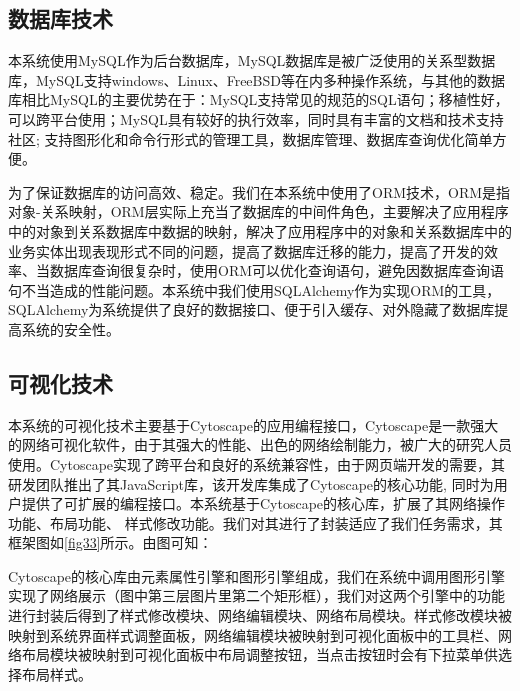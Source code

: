 \subsection{数据库技术}
本系统使用MySQL作为后台数据库，MySQL数据库是被广泛使用的关系型数据库，MySQL支持windows、Linux、FreeBSD等在内多种操作系统，与其他的数据库相比MySQL的主要优势在于：MySQL支持常见的规范的SQL语句；移植性好，可以跨平台使用；MySQL具有较好的执行效率，同时具有丰富的文档和技术支持社区; 支持图形化和命令行形式的管理工具，数据库管理、数据库查询优化简单方便。

为了保证数据库的访问高效、稳定。我们在本系统中使用了ORM技术，ORM是指对象-关系映射，ORM层实际上充当了数据库的中间件角色，主要解决了应用程序中的对象到关系数据库中数据的映射，解决了应用程序中的对象和关系数据库中的业务实体出现表现形式不同的问题，提高了数据库迁移的能力，提高了开发的效率、当数据库查询很复杂时，使用ORM可以优化查询语句，避免因数据库查询语句不当造成的性能问题。本系统中我们使用SQLAlchemy作为实现ORM的工具，SQLAlchemy为系统提供了良好的数据接口、便于引入缓存、对外隐藏了数据库提高系统的安全性。

\subsection{可视化技术}
本系统的可视化技术主要基于Cytoscape的应用编程接口，Cytoscape是一款强大的网络可视化软件，由于其强大的性能、出色的网络绘制能力，被广大的研究人员使用。Cytoscape实现了跨平台和良好的系统兼容性，由于网页端开发的需要，其研发团队推出了其JavaScript库，该开发库集成了Cytoscape的核心功能, 同时为用户提供了可扩展的编程接口。本系统基于Cytoscape的核心库，扩展了其网络操作功能、布局功能、 样式修改功能。我们对其进行了封装适应了我们任务需求，其框架图如\ref{fig33}所示。由图可知：


Cytoscape的核心库由元素属性引擎和图形引擎组成，我们在系统中调用图形引擎实现了网络展示（图中第三层图片里第二个矩形框），我们对这两个引擎中的功能进行封装后得到了样式修改模块、网络编辑模块、网络布局模块。样式修改模块被映射到系统界面样式调整面板，网络编辑模块被映射到可视化面板中的工具栏、网络布局模块被映射到可视化面板中布局调整按钮，当点击按钮时会有下拉菜单供选择布局样式。

